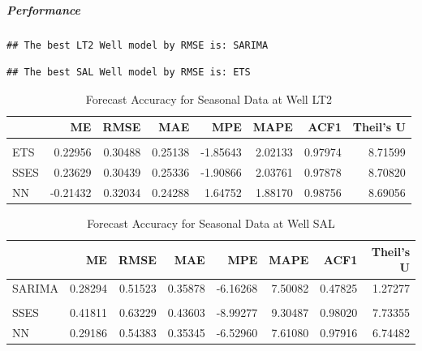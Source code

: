 \documentclass[
]{article}
\begin{document}
\hypertarget{performance}{%
\subparagraph{Performance}\label{performance}}

\begin{verbatim}
## The best LT2 Well model by RMSE is: SARIMA
\end{verbatim}

\begin{verbatim}
## The best SAL Well model by RMSE is: ETS
\end{verbatim}

\begin{table}
\centering\centering
\caption{\label{tab:Comparing Performance Metrics}Forecast Accuracy for Seasonal Data at Well LT2}
\centering
\begin{tabular}[t]{l|r|r|r|r|r|r|r}
\hline
  & ME & RMSE & MAE & MPE & MAPE & ACF1 & Theil's U\\
\hline
\cellcolor{gray!10}{SARIMA} & \cellcolor{gray!10}{0.18533} & \cellcolor{gray!10}{0.25429} & \cellcolor{gray!10}{0.20708} & \cellcolor{gray!10}{-1.50064} & \cellcolor{gray!10}{1.66526} & \cellcolor{gray!10}{0.78460} & \cellcolor{gray!10}{1.76030}\\
\hline
ETS & 0.22956 & 0.30488 & 0.25138 & -1.85643 & 2.02133 & 0.97974 & 8.71599\\
\hline
SSES & 0.23629 & 0.30439 & 0.25336 & -1.90866 & 2.03761 & 0.97878 & 8.70820\\
\hline
NN & -0.21432 & 0.32034 & 0.24288 & 1.64752 & 1.88170 & 0.98756 & 8.69056\\
\hline
\end{tabular}
\end{table}

\begin{table}
\centering\centering
\caption{\label{tab:Comparing Performance Metrics}Forecast Accuracy for Seasonal Data at Well SAL}
\centering
\begin{tabular}[t]{l|r|r|r|r|r|r|r}
\hline
  & ME & RMSE & MAE & MPE & MAPE & ACF1 & Theil's U\\
\hline
SARIMA & 0.28294 & 0.51523 & 0.35878 & -6.16268 & 7.50082 & 0.47825 & 1.27277\\
\hline
\cellcolor{gray!10}{ETS} & \cellcolor{gray!10}{0.18165} & \cellcolor{gray!10}{0.40155} & \cellcolor{gray!10}{0.24084} & \cellcolor{gray!10}{-4.12608} & \cellcolor{gray!10}{5.22038} & \cellcolor{gray!10}{0.96610} & \cellcolor{gray!10}{5.06406}\\
\hline
SSES & 0.41811 & 0.63229 & 0.43603 & -8.99277 & 9.30487 & 0.98020 & 7.73355\\
\hline
NN & 0.29186 & 0.54383 & 0.35345 & -6.52960 & 7.61080 & 0.97916 & 6.74482\\
\hline
\end{tabular}
\end{table}
\end{document}
